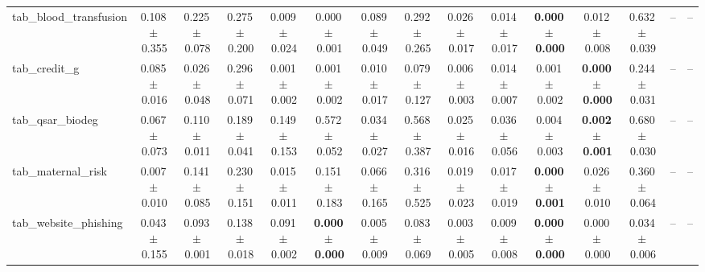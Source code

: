 \documentclass[8pt]{extarticle}
\begin{document}
\begin{longtable}{l*{14}{c}}
tab\_blood\_transfusion & 0.108\,$\pm$\,0.355 & 0.225\,$\pm$\,0.078 & 0.275\,$\pm$\,0.200 & 0.009\,$\pm$\,0.024 & 0.000\,$\pm$\,0.001 & 0.089\,$\pm$\,0.049 & 0.292\,$\pm$\,0.265 & 0.026\,$\pm$\,0.017 & 0.014\,$\pm$\,0.017 & \textbf{0.000\,$\pm$\,0.000} & 0.012\,$\pm$\,0.008 & 0.632\,$\pm$\,0.039 & -- & -- \\
tab\_credit\_g & 0.085\,$\pm$\,0.016 & 0.026\,$\pm$\,0.048 & 0.296\,$\pm$\,0.071 & 0.001\,$\pm$\,0.002 & 0.001\,$\pm$\,0.002 & 0.010\,$\pm$\,0.017 & 0.079\,$\pm$\,0.127 & 0.006\,$\pm$\,0.003 & 0.014\,$\pm$\,0.007 & 0.001\,$\pm$\,0.002 & \textbf{0.000\,$\pm$\,0.000} & 0.244\,$\pm$\,0.031 & -- & -- \\
tab\_qsar\_biodeg & 0.067\,$\pm$\,0.073 & 0.110\,$\pm$\,0.011 & 0.189\,$\pm$\,0.041 & 0.149\,$\pm$\,0.153 & 0.572\,$\pm$\,0.052 & 0.034\,$\pm$\,0.027 & 0.568\,$\pm$\,0.387 & 0.025\,$\pm$\,0.016 & 0.036\,$\pm$\,0.056 & 0.004\,$\pm$\,0.003 & \textbf{0.002\,$\pm$\,0.001} & 0.680\,$\pm$\,0.030 & -- & -- \\
tab\_maternal\_risk & 0.007\,$\pm$\,0.010 & 0.141\,$\pm$\,0.085 & 0.230\,$\pm$\,0.151 & 0.015\,$\pm$\,0.011 & 0.151\,$\pm$\,0.183 & 0.066\,$\pm$\,0.165 & 0.316\,$\pm$\,0.525 & 0.019\,$\pm$\,0.023 & 0.017\,$\pm$\,0.019 & \textbf{0.000\,$\pm$\,0.001} & 0.026\,$\pm$\,0.010 & 0.360\,$\pm$\,0.064 & -- & -- \\
tab\_website\_phishing & 0.043\,$\pm$\,0.155 & 0.093\,$\pm$\,0.001 & 0.138\,$\pm$\,0.018 & 0.091\,$\pm$\,0.002 & \textbf{0.000\,$\pm$\,0.000} & 0.005\,$\pm$\,0.009 & 0.083\,$\pm$\,0.069 & 0.003\,$\pm$\,0.005 & 0.009\,$\pm$\,0.008 & \textbf{0.000\,$\pm$\,0.000} & 0.000\,$\pm$\,0.000 & 0.034\,$\pm$\,0.006 & -- & -- \\
\end{longtable}
\end{document}
